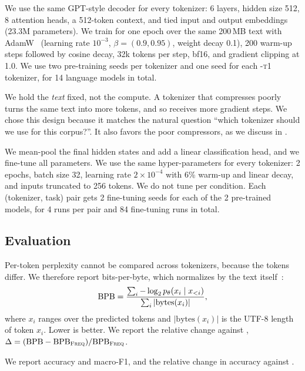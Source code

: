 We use the same GPT-style decoder for every tokenizer: 6 layers, hidden size 512, 8 attention heads, a 512-token context, and tied input and output embeddings (23.3M parameters).
We train for one epoch over the same 200\,MB text with AdamW~\citep{loshchilov2019decoupled} (learning rate $10^{-3}$, $\beta=(0.9,0.95)$, weight decay 0.1), 200 warm-up steps followed by cosine decay, 32k tokens per step, bf16, and gradient clipping at 1.0.
We use two pre-training seeds per tokenizer and one seed for each \textsc{-t1} tokenizer, for 14 language models in total.

We hold the \emph{text} fixed, not the compute.
A tokenizer that compresses poorly turns the same text into more tokens, and so receives more gradient steps.
We chose this design because it matches the natural question ``which tokenizer should we use for this corpus?''.
It also favors the poor compressors, as we discuss in .

We mean-pool the final hidden states and add a linear classification head, and we fine-tune all parameters.
We use the same hyper-parameters for every tokenizer: 2 epochs, batch size 32, learning rate $2\times10^{-4}$ with 6\% warm-up and linear decay, and inputs truncated to 256 tokens.
We do not tune per condition.
Each (tokenizer, task) pair gets 2 fine-tuning seeds for each of the 2 pre-trained models, for 4 runs per pair and 84 fine-tuning runs in total.

\subsection{Evaluation}
\label{sec:eval}

Per-token perplexity cannot be compared across tokenizers, because the tokens differ.
We therefore report bits-per-byte, which normalizes by the text itself~\citep{gao2020pile}:
\begin{equation}
    \text{BPB} = \frac{\sum_{i} -\log_2 p_\theta(x_i \mid x_{<i})}{\sum_{i} |\mathrm{bytes}(x_i)|},
    \label{eq:bpb}
\end{equation}
where $x_i$ ranges over the predicted tokens and $|\mathrm{bytes}(x_i)|$ is the UTF-8 length of token $x_i$.
Lower is better.
We report the relative change against \freq, $\Delta = (\text{BPB} - \text{BPB}_{\textsc{Freq}}) / \text{BPB}_{\textsc{Freq}}$.

We report accuracy and macro-F1, and the relative change in accuracy against \freq.

